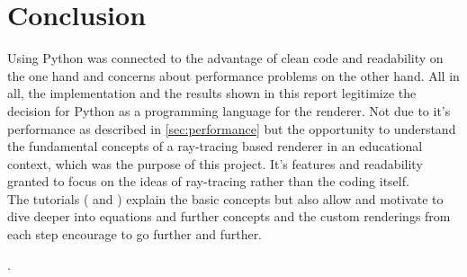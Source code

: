 \documentclass[]{article}
\begin{document}
		
	\section{Conclusion}
		Using Python was connected to the advantage of clean code and readability on the one hand and concerns about performance problems on the other hand. All in all, the implementation and the results shown in this report legitimize the decision for Python as a programming language for the renderer. Not due to it's performance as described in \cref{sec:performance} but the opportunity to understand the fundamental concepts of a ray-tracing based renderer in an educational context, which was the purpose of this project. It's features and readability granted to focus on the ideas of ray-tracing rather than the coding itself.
		\\
		The tutorials (\cite{Shirley2020RTW1} and \cite{Shirley2020RTW2}) explain the basic concepts but also allow and motivate to dive deeper into equations and further concepts and the custom renderings from each step encourage to go further and further.
	
	\vfill
	\printbibliography[heading=bibintoc].
		
\end{document}
